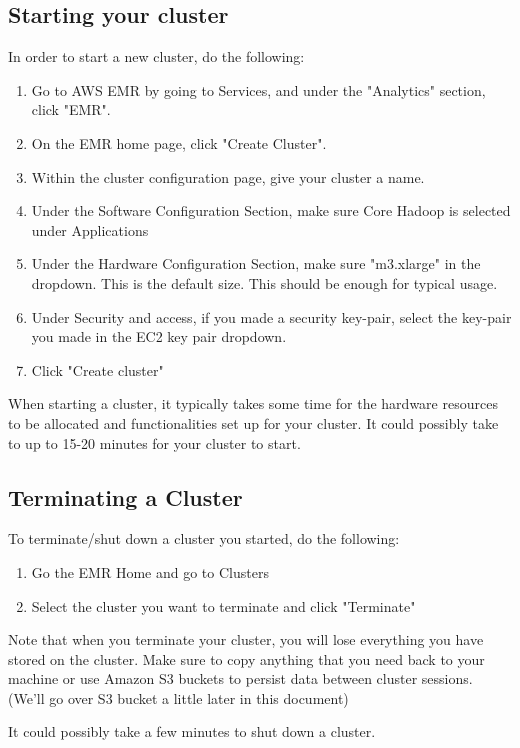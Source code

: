 \documentclass{article}
\begin{document}
\subsection{Starting your cluster}
In order to start a new cluster, do the following:
\begin{enumerate}
    \item Go to AWS EMR by going to Services,  and under the "Analytics" section, click "EMR".
    \item On the EMR home page, click "Create Cluster".
    \item Within the cluster configuration page, give your cluster a name.
    \item Under the Software Configuration Section, make sure Core Hadoop is selected under Applications
    \item Under the Hardware Configuration Section, make sure "m3.xlarge" in the dropdown. This is the default size. This should be enough for typical usage.
    \item Under Security and access, if you made a security key-pair, select the key-pair you made in the EC2 key pair dropdown.
    \item Click "Create cluster"
\end{enumerate}
\begin{info}
When starting a cluster, it typically takes some time for the hardware resources to be allocated and functionalities set up for your cluster. It could possibly take to up to 15-20 minutes for your cluster to start.
\end{info}
\subsection{Terminating a Cluster}
To terminate/shut down a cluster you started, do the following:
\begin{enumerate}
    \item Go the EMR Home and go to Clusters
    \item Select the cluster you want to terminate and click "Terminate"
\end{enumerate}
\begin{info}
Note that when you terminate your cluster, you will lose everything you have stored on the cluster. Make sure to copy anything that you need back to your machine or use Amazon S3 buckets to persist data between cluster sessions. (We'll go over S3 bucket a little later in this document)
\end{info}
\begin{info}
It could possibly take a few minutes to shut down a cluster.
\end{info}
\end{document}
